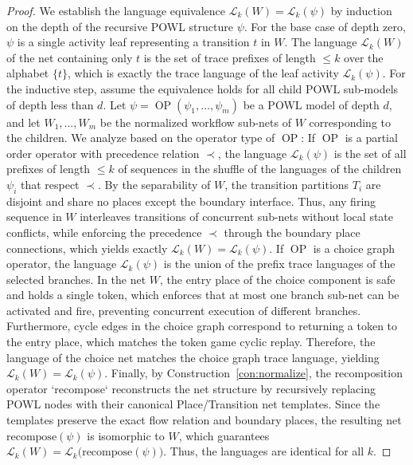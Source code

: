 \documentclass[11pt,oneside]{book}
\theoremstyle{definition}
\theoremstyle{plain}
\theoremstyle{remark}
\begin{document}
\begin{proof}
We establish the language equivalence $\mathcal{L}_k(W) = \mathcal{L}_k(\psi)$ by induction on the depth of the recursive POWL structure $\psi$.%
For the base case of depth zero, $\psi$ is a single activity leaf representing a transition $t$ in $W$.%
The language $\mathcal{L}_k(W)$ of the net containing only $t$ is the set of trace prefixes of length $\le k$ over the alphabet $\{t\}$, which is exactly the trace language of the leaf activity $\mathcal{L}_k(\psi)$.%
For the inductive step, assume the equivalence holds for all child POWL sub-models of depth less than $d$.%
Let $\psi = \operatorname{OP}(\psi_1, \dots, \psi_m)$ be a POWL model of depth $d$, and let $W_1, \dots, W_m$ be the normalized workflow sub-nets of $W$ corresponding to the children.%
We analyze based on the operator type of $\operatorname{OP}$:%
If $\operatorname{OP}$ is a partial order operator with precedence relation $\prec$, the language $\mathcal{L}_k(\psi)$ is the set of all prefixes of length $\le k$ of sequences in the shuffle of the languages of the children $\psi_i$ that respect $\prec$.%
By the separability of $W$, the transition partitions $T_i$ are disjoint and share no places except the boundary interface.%
Thus, any firing sequence in $W$ interleaves transitions of concurrent sub-nets without local state conflicts, while enforcing the precedence $\prec$ through the boundary place connections, which yields exactly $\mathcal{L}_k(W) = \mathcal{L}_k(\psi)$.%
If $\operatorname{OP}$ is a choice graph operator, the language $\mathcal{L}_k(\psi)$ is the union of the prefix trace languages of the selected branches.%
In the net $W$, the entry place of the choice component is safe and holds a single token, which enforces that at most one branch sub-net can be activated and fire, preventing concurrent execution of different branches.%
Furthermore, cycle edges in the choice graph correspond to returning a token to the entry place, which matches the token game cyclic replay.%
Therefore, the language of the choice net matches the choice graph trace language, yielding $\mathcal{L}_k(W) = \mathcal{L}_k(\psi)$.%
Finally, by Construction~\ref{con:normalize}, the recomposition operator `recompose` reconstructs the net structure by recursively replacing POWL nodes with their canonical Place/Transition net templates.%
Since the templates preserve the exact flow relation and boundary places, the resulting net $\text{recompose}(\psi)$ is isomorphic to $W$, which guarantees $\mathcal{L}_k(W) = \mathcal{L}_k\bigl(\text{recompose}(\psi)\bigr)$.%
Thus, the languages are identical for all $k$.%
\end{proof}
\end{document}
